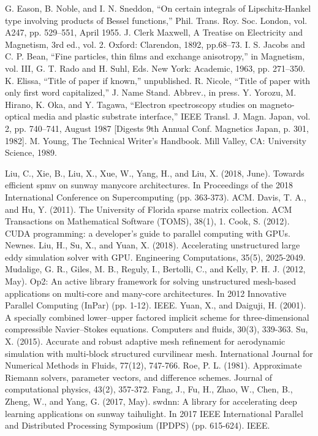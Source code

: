 \documentclass[conference]{IEEEtran}
\begin{document}
\begin{thebibliography}{00}
 G. Eason, B. Noble, and I. N. Sneddon, ``On certain integrals of Lipschitz-Hankel type involving products of Bessel functions,'' Phil. Trans. Roy. Soc. London, vol. A247, pp. 529--551, April 1955.
 J. Clerk Maxwell, A Treatise on Electricity and Magnetism, 3rd ed., vol. 2. Oxford: Clarendon, 1892, pp.68--73.
 I. S. Jacobs and C. P. Bean, ``Fine particles, thin films and exchange anisotropy,'' in Magnetism, vol. III, G. T. Rado and H. Suhl, Eds. New York: Academic, 1963, pp. 271--350.
 K. Elissa, ``Title of paper if known,'' unpublished.
 R. Nicole, ``Title of paper with only first word capitalized,'' J. Name Stand. Abbrev., in press.
 Y. Yorozu, M. Hirano, K. Oka, and Y. Tagawa, ``Electron spectroscopy studies on magneto-optical media and plastic substrate interface,'' IEEE Transl. J. Magn. Japan, vol. 2, pp. 740--741, August 1987 [Digests 9th Annual Conf. Magnetics Japan, p. 301, 1982].
 M. Young, The Technical Writer's Handbook. Mill Valley, CA: University Science, 1989.

 Liu, C., Xie, B., Liu, X., Xue, W., Yang, H., and Liu, X. (2018, June). Towards efficient spmv on sunway manycore architectures. In Proceedings of the 2018 International Conference on Supercomputing (pp. 363-373). ACM.
 Davis, T. A., and Hu, Y. (2011). The University of Florida sparse matrix collection. ACM Transactions on Mathematical Software (TOMS), 38(1), 1.
 Cook, S. (2012). CUDA programming: a developer's guide to parallel computing with GPUs. Newnes.
 Liu, H., Su, X., and Yuan, X. (2018). Accelerating unstructured large eddy simulation solver with GPU. Engineering Computations, 35(5), 2025-2049.
 Mudalige, G. R., Giles, M. B., Reguly, I., Bertolli, C., and Kelly, P. H. J. (2012, May). Op2: An active library framework for solving unstructured mesh-based applications on multi-core and many-core architectures. In 2012 Innovative Parallel Computing (InPar) (pp. 1-12). IEEE.
 Yuan, X., and Daiguji, H. (2001). A specially combined lower–upper factored implicit scheme for three-dimensional compressible Navier–Stokes equations. Computers and fluids, 30(3), 339-363.
 Su, X. (2015). Accurate and robust adaptive mesh refinement for aerodynamic simulation with multi‐block structured curvilinear mesh. International Journal for Numerical Methods in Fluids, 77(12), 747-766.
 Roe, P. L. (1981). Approximate Riemann solvers, parameter vectors, and difference schemes. Journal of computational physics, 43(2), 357-372.
 Fang, J., Fu, H., Zhao, W., Chen, B., Zheng, W., and Yang, G. (2017, May). swdnn: A library for accelerating deep learning applications on sunway taihulight. In 2017 IEEE International Parallel and Distributed Processing Symposium (IPDPS) (pp. 615-624). IEEE.

\end{thebibliography}
\end{document}
